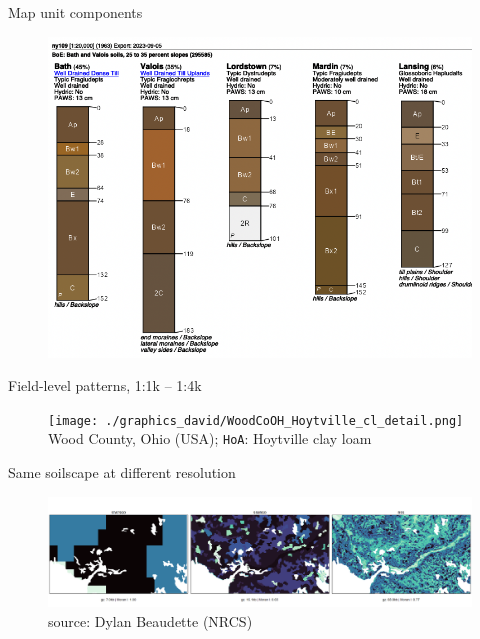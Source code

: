 \documentclass[aspectratio=169]{beamer}
\begin{document}
\begin{frame}{Map unit components}
    \begin{figure}
        \centering
\includegraphics[height=0.75\textheight]{./graphics_david/Bath_Valois_profiles.png}
     \end{figure}
    \end{frame}

\begin{frame}{Field-level patterns, 1:1k -- 1:4k}
        \begin{figure}
        \centering
\texttt{[image: ./graphics\_david/WoodCoOH\_Hoytville\_cl\_detail.png]}\\
{Wood County, Ohio (USA); \texttt{HoA}: Hoytville clay loam}
     \end{figure}
\end{frame}

\begin{frame}{Same soilscape at different resolution}
    \begin{figure}
        \centering
        \includegraphics[width=\linewidth]{./graphics_david/Dylan_ND005-example-01.png}
\\source: Dylan Beaudette (NRCS)
    \end{figure}
\end{frame}
\end{document}

